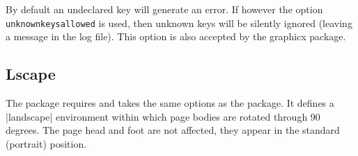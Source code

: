 By default an undeclared key will generate an error.
If however the option  \texttt{unknownkeysallowed} is used, then
unknown keys will be silently ignored (leaving a message in the log
file). This option is also accepted by the \textsf{graphicx} package.

\iffalse

\subsection{Pstcol}
\package{PSTricks}, by Timothy Van Zandt is an immensely powerful
package that enables a very full featured interface between PostScript
and \TeX. Unfortunately the colour support in \package{PSTricks} is
slightly incompatible with the colour mechanism defined in the
\package{color} package. The \package{pstcol} package is a (hopefully
temporary) package that modifies a very small number of internal
PSTricks functions, to remove this incompatibility. If
\package{pstricks} is loaded via this package, you may use any colours
defined by \package{color} package commands within \package{pstricks}
commands, and vice versa.

\fi

\subsection{Lscape}
The  package requires and takes the same options
as the  package. It defines a |landscape| environment
within which page bodies are rotated through 90 degrees. The page head
and foot are not affected, they appear in the standard (portrait)
position.

